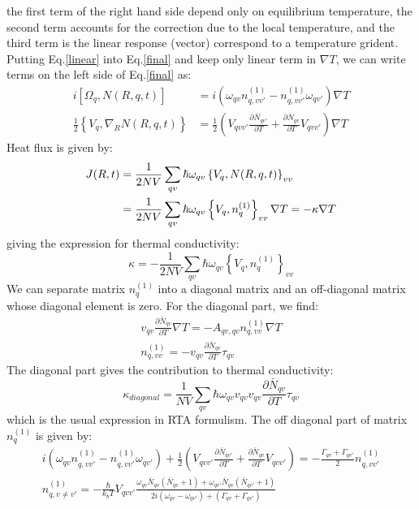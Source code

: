 \documentclass{article}
\begin{document}
the first term of the right hand side depend only on equilibrium temperature, the second term accounts for the correction 
due to the local temperature, and the third term is the linear response (vector) correspond to a temperature grident.
Putting Eq.\ref{linear} into Eq.\ref{final} and keep only linear term in $\nabla T$, we can write terms on the left side of Eq.\ref{final} as:
\begin{align}
    i \left[ \Omega_{q},N(R,q,t) \right] &= i \left( \omega_{qv} n^{(1)}_{q,vv'} - n^{(1)}_{q,vv'} \omega_{qv'} \right) \nabla T \\
    \frac{1}{2} \left\{ V_{q}, \nabla_R N(R,q,t) \right\} &= 
            \frac{1}{2} \left( V_{qvv'} \frac{\partial \bar{N}_{qv'}}{\partial T} + \frac{\partial \bar{N}_{qv}}{\partial T} V_{qvv'} \right) \nabla T
\end{align}
Heat flux is given by:
\begin{align}
    J(R,t) &= \frac{1}{2NV} \sum_{qv} \hbar \omega_{qv} \left\{ V_q, N(R,q,t)  \right\}_{vv} \notag \\
           &= \frac{1}{2NV} \sum_{qv} \hbar \omega_{qv} \left\{ V_q, n^{(1)}_{q}  \right\}_{vv}\nabla T = - \kappa \nabla T
\end{align}
giving the expression for thermal conductivity:
\begin{equation}
    \kappa = - \frac{1}{2NV} \sum_{qv} \hbar \omega_{qv} \left\{ V_q, n^{(1)}_{q}  \right\}_{vv}
\end{equation}
We can separate matrix $n^{(1)}_{q}$ into a diagonal matrix and an off-diagonal matrix whose diagonal element is zero. 
For the diagonal part, we find:
\begin{gather}
    v_{qv} \frac{\partial \bar{N}_{qv}}{\partial T} \nabla T = - A_{qv,qv} n^{(1)}_{q,vv} \nabla T \\
    n^{(1)}_{q,vv} = - v_{qv} \frac{\partial \bar{N}_{qv}}{\partial T} \tau_{qv}
\end{gather}
The diagonal part gives the contribution to thermal conductivity:
\begin{equation}
    \kappa_{diagonal} = \frac{1}{NV} \sum_{qv} \hbar \omega_{qv} v_{qv} v_{qv} \frac{\partial \bar{N}_{qv}}{\partial T} \tau_{qv}
\end{equation}
which is the usual expression in RTA formulism. The off diagonal part of matrix $n^{(1)}_{q}$ is given by:
\begin{gather}
    i \left( \omega_{qv} n^{(1)}_{q,vv'} - n^{(1)}_{q,vv'} \omega_{qv'} \right) 
    + \frac{1}{2} \left( V_{qvv'} \frac{\partial \bar{N}_{qv'}}{\partial T} + \frac{\partial \bar{N}_{qv}}{\partial T} V_{qvv'} \right)
    = - \frac{\Gamma_{qv}+ \Gamma_{qv'}}{2} n^{(1)}_{q,vv'} \\
    n^{(1)}_{q,v\neq v'} = -\frac{\hbar}{k_b T} V_{qvv'} 
    \frac{\omega_{qv}\bar{N}_{qv} (\bar{N}_{qv} + 1) + \omega_{qv'} \bar{N}_{qv} (\bar{N}_{qv'} + 1)}{2i(\omega_{qv} - \omega_{qv'}) + (\Gamma_{qv}+ \Gamma_{qv'})}
\end{gather}
\end{document}

